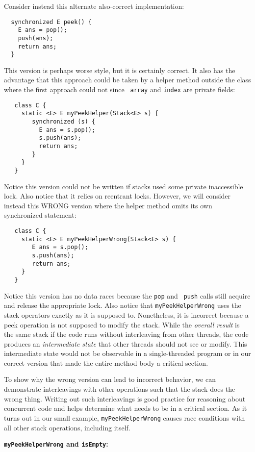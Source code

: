 \documentclass[10pt]{article}
\begin{document}
Consider instead this alternate also-correct implementation:
\begin{verbatim}
  synchronized E peek() {
    E ans = pop();
    push(ans);
    return ans;
  }
\end{verbatim}
This version is perhaps worse style, but it is certainly correct.  It
also has the advantage that this approach could be taken by a helper
method outside the class where the first approach could not since {\tt
  array} and {\tt index} are private fields:
\begin{verbatim}
   class C {
     static <E> E myPeekHelper(Stack<E> s) {
        synchronized (s) {
          E ans = s.pop();
          s.push(ans);
          return ans;
        }
     }
   }
\end{verbatim}
Notice this version could not be written if stacks used some private
inaccessible lock.  Also notice that it relies on reentrant locks.
However, we will consider instead this WRONG version where the helper
method omits its own synchronized statement:
\begin{verbatim}
   class C {
     static <E> E myPeekHelperWrong(Stack<E> s) {
        E ans = s.pop();
        s.push(ans);
        return ans;
     }
   }
\end{verbatim}
Notice this version has no data races because the {\tt pop} and {\tt
  push} calls still acquire and release the appropriate lock.  Also
  notice that {\tt myPeekHelperWrong} uses the stack operators exactly as
  it is supposed to.  Nonetheless, it is incorrect because
  a peek operation is not supposed to modify the stack.  While
  the \emph{overall result} is the same stack if the code runs without
  interleaving from other threads, the code produces an
  \emph{intermediate state} that other threads should not see or modify.  This
  intermediate state would not be observable in a single-threaded
  program or in our correct version that made the entire method body a
  critical section.

To show why the wrong version can lead to incorrect behavior, we can
demonstrate interleavings with other operations such that the stack
does the wrong thing.  Writing out such interleavings is good practice
for reasoning about concurrent code and helps determine what needs to
be in a critical section.  As it turns out in our small example, 
{\tt myPeekHelperWrong} causes race conditions with all other stack
operations, including itself.

\medskip
\noindent\textbf{{\tt myPeekHelperWrong} and {\tt isEmpty}:}
\medskip
\end{document}
